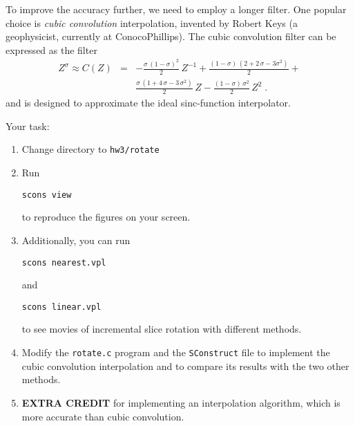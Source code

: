 To improve the accuracy further, we need to employ a longer
filter. One popular choice is \emph{cubic convolution} interpolation,
invented by Robert Keys (a geophysicist, currently at ConocoPhillips).
The cubic convolution filter can be expressed as the
filter \cite[]{keys}
\begin{eqnarray}
\nonumber
Z^{\sigma} \approx C(Z) & = & -\frac{\sigma\,(1-\sigma)^2}{2}\,Z^{-1} + 
\frac{(1-\sigma)\,(2 + 2\,\sigma - 3 \sigma^2)}{2} + \\
&  & \frac{\sigma\,(1 + 4\,\sigma - 3\,\sigma^2)}{2}\,Z - \frac{(1-\sigma)\,\sigma^2}{2}\,Z^2\;.
\label{eq:cubic}
\end{eqnarray}
and is designed to approximate the ideal sinc-function interpolator.


\lstset{language=c,numbers=left,numberstyle=\tiny,showstringspaces=false}


\lstset{language=python,numbers=left,numberstyle=\tiny,showstringspaces=false}


\lstset{language=python,numbers=left,numberstyle=\tiny,showstringspaces=false}


Your task:
\begin{enumerate}
\item Change directory to \texttt{hw3/rotate}
\item Run 
\begin{verbatim}
scons view
\end{verbatim}
to reproduce the figures on your screen.
\item Additionally, you can run
\begin{verbatim}
scons nearest.vpl
\end{verbatim}
and
\begin{verbatim}
scons linear.vpl
\end{verbatim}
to see movies of incremental slice rotation with different methods.
\item Modify the \texttt{rotate.c} program and the \texttt{SConstruct} file to implement 
the cubic convolution interpolation and to compare 
its results with the two other methods.
\item \textbf{EXTRA CREDIT} for implementing an interpolation algorithm, which 
is more accurate than cubic convolution.
\end{enumerate}


